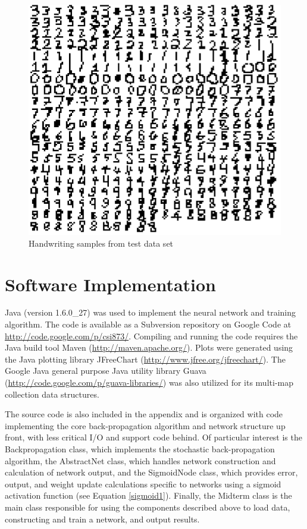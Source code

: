 \documentclass{article}
\begin{document}
\begin{figure}
\centering
\includegraphics[width=1.00\textwidth]{data/visualization/all_testing_data.png}
\caption{Handwriting samples from test data set}
\label{test_all}
\end{figure}

\section{Software Implementation}\label{Software Implementation}

Java (version 1.6.0\_27) was used to implement the neural network and training algorithm. The code is available as a Subversion repository on Google Code at \url{http://code.google.com/p/csi873/}. Compiling and running the code requires the Java build tool Maven (\url{http://maven.apache.org/}). Plots were generated using the Java plotting library JFreeChart (\url{http://www.jfree.org/jfreechart/}). The Google Java general purpose Java utility library Guava (\url{http://code.google.com/p/guava-libraries/}) was also utilized for its multi-map collection data structures.

The source code is also included in the appendix and is organized with code implementing the core back-propagation algorithm and network structure up front, with less critical I/O and support code behind. Of particular interest is the Backpropagation class, which implements the stochastic back-propagation algorithm, the AbstractNet class, which handles network construction and calculation of network output, and the SigmoidNode class, which provides error, output, and weight update calculations specific to networks using a sigmoid activation function (see Equation \ref{sigmoid1}). Finally, the Midterm class is the main class responsible for using the components described above to load data, constructing and train a network, and output results.
\end{document}
